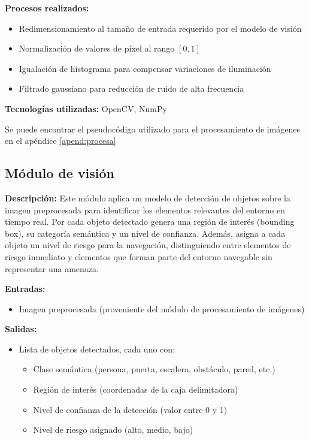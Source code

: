 \textbf{Procesos realizados:}
\begin{itemize}
    \item Redimensionamiento al tamaño de entrada requerido por el modelo de visión
    \item Normalización de valores de píxel al rango $[0, 1]$
    \item Igualación de histograma para compensar variaciones de iluminación
    \item Filtrado gaussiano para reducción de ruido de alta frecuencia
\end{itemize}

\textbf{Tecnologías utilizadas:} OpenCV, NumPy

Se puede encontrar el pseudocódigo utilizado para el procesamiento de imágenes en el apéndice \ref{apend:procesa}

\subsection{Módulo de visión}

\textbf{Descripción:}
Este módulo aplica un modelo de detección de objetos sobre la imagen preprocesada para identificar los elementos relevantes del entorno en tiempo real. Por cada objeto detectado genera una región de interés (bounding box), su categoría semántica y un nivel de confianza. Además, asigna a cada objeto un nivel de riesgo para la navegación, distinguiendo entre elementos de riesgo inmediato y elementos que forman parte del entorno
navegable sin representar una amenaza.

\textbf{Entradas:}
\begin{itemize}
    \item Imagen preprocesada (proveniente del módulo de procesamiento de imágenes)
\end{itemize}

\textbf{Salidas:}
\begin{itemize}
    \item Lista de objetos detectados, cada uno con:
    \begin{itemize}
        \item Clase semántica (persona, puerta, escalera, obstáculo, pared, etc.)
        \item Región de interés (coordenadas de la caja delimitadora)
        \item Nivel de confianza de la detección (valor entre 0 y 1)
        \item Nivel de riesgo asignado (alto, medio, bajo)
    \end{itemize}
\end{itemize}

